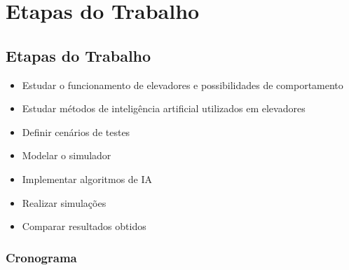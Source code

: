 \chapter{\label{chap:stages}Etapas do Trabalho}

\section{Etapas do Trabalho}

\begin{itemize}
    \item Estudar o funcionamento de elevadores e possibilidades de comportamento
    \item Estudar métodos de inteligência artificial utilizados em elevadores
    \item Definir cenários de testes
    \item Modelar o simulador
    \item Implementar algoritmos de IA
    \item Realizar simulações
    \item Comparar resultados obtidos
\end{itemize}

\subsection{Cronograma}